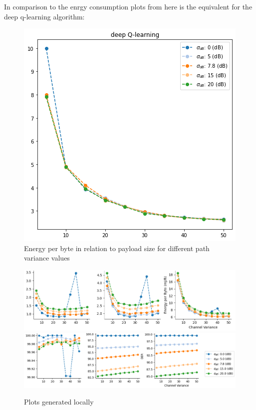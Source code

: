 In comparison to the enrgy consumption plots 
from \cite{simulator} here is the equivalent
for the deep q-learning algorithm:

\newpage

\begin{figure}[H]
\centering
\hspace*{-1.5cm}  
\includegraphics[scale=0.30]{plots/adr/energy_variance_payload.png}
  \caption{Energy per byte in relation to payload size for different path variance values}
\end{figure}

\begin{figure}[H]
\centering
\includegraphics[scale=0.5]{figures/my_plots_1.PNG}\\
\hspace*{1.3cm}  
\includegraphics[scale=0.5]{figures/my_plots_2.PNG}
  \caption{Plots generated locally}
  \label{fig:my_sectors}
\end{figure}


